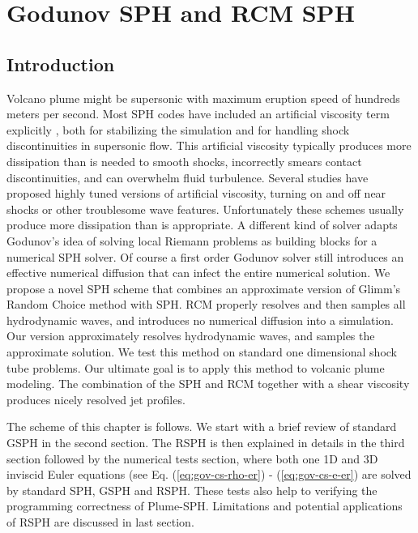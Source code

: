 \chapter{Godunov SPH and RCM SPH} \label{chapter:GSPH-RSPH}

\section{Introduction}
Volcano plume might be supersonic with maximum eruption speed of hundreds meters per second.
Most SPH codes have included an artificial viscosity term explicitly \citep{monaghan1983shock, monaghan1997sph, klapp2012strong}, both for stabilizing the simulation and for handling shock discontinuities in supersonic flow. This artificial viscosity typically produces more dissipation than is needed to smooth shocks, incorrectly smears contact discontinuities, and can overwhelm fluid turbulence. Several studies have proposed highly tuned versions of artificial viscosity, turning on and off near shocks or other troublesome wave features. Unfortunately these schemes usually produce more dissipation than is appropriate.
A different kind of solver adapts Godunov\rq{}s idea of solving local Riemann problems as building blocks for a numerical SPH solver. Of course a first order Godunov solver still introduces an effective numerical diffusion that can infect the entire numerical solution.
We propose a novel SPH scheme that combines an approximate version of Glimm\rq{}s Random Choice method with SPH. RCM properly resolves and then samples all hydrodynamic waves, and introduces no numerical diffusion into a simulation. Our version approximately resolves hydrodynamic waves, and samples the approximate solution.
We test this method on standard one dimensional shock tube problems.
Our ultimate goal is to apply this method to volcanic plume modeling. The combination of the SPH and RCM together with a shear viscosity produces nicely resolved jet profiles.

The scheme of this chapter is follows. We start with a brief review of standard GSPH in the second section. The RSPH is then explained in details in the third section followed by the numerical tests section, where both one 1D and 3D inviscid Euler equations (see Eq. (\ref{eq:gov-cs-rho-er}) - (\ref{eq:gov-cs-e-er}) are solved by standard SPH, GSPH and RSPH. These tests also help to verifying the programming correctness of Plume-SPH. Limitations and potential applications of RSPH are discussed in last section. 

